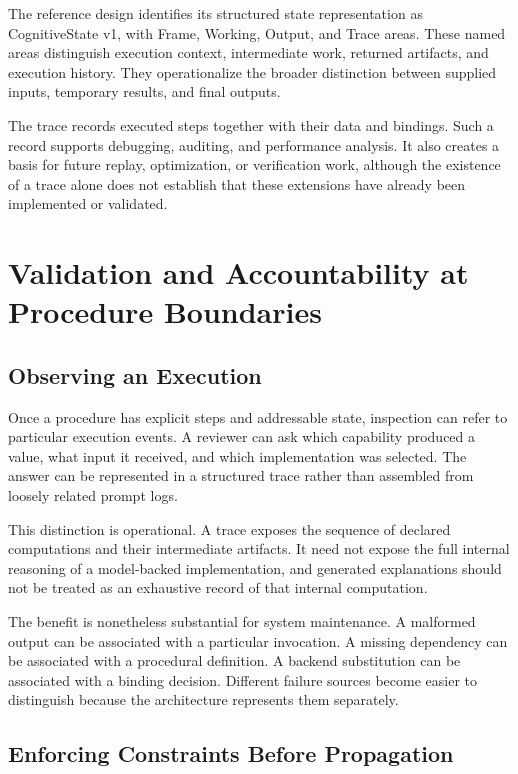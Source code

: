 \documentclass[10pt,twocolumn,a4paper]{article}
\begin{document}
The reference design identifies its structured state representation as CognitiveState v1, with Frame, Working, Output, and Trace areas. These named areas distinguish execution context, intermediate work, returned artifacts, and execution history. They operationalize the broader distinction between supplied inputs, temporary results, and final outputs.


The trace records executed steps together with their data and bindings. Such a record supports debugging, auditing, and performance analysis. It also creates a basis for future replay, optimization, or verification work, although the existence of a trace alone does not establish that these extensions have already been implemented or validated.


\section{Validation and Accountability at Procedure Boundaries}

\subsection{Observing an Execution}

Once a procedure has explicit steps and addressable state, inspection can refer to particular execution events. A reviewer can ask which capability produced a value, what input it received, and which implementation was selected. The answer can be represented in a structured trace rather than assembled from loosely related prompt logs.


This distinction is operational. A trace exposes the sequence of declared computations and their intermediate artifacts. It need not expose the full internal reasoning of a model-backed implementation, and generated explanations should not be treated as an exhaustive record of that internal computation.


The benefit is nonetheless substantial for system maintenance. A malformed output can be associated with a particular invocation. A missing dependency can be associated with a procedural definition. A backend substitution can be associated with a binding decision. Different failure sources become easier to distinguish because the architecture represents them separately.


\subsection{Enforcing Constraints Before Propagation}
\end{document}
